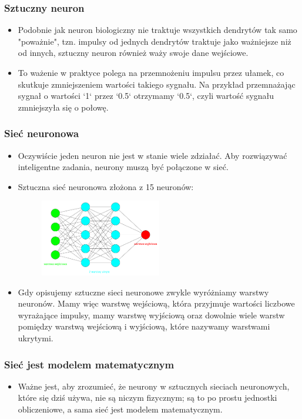 \documentclass{beamer}
\begin{document}
\begin{frame}[fragile]
\frametitle{Sztuczny neuron}
\begin{itemize}
\item Podobnie jak neuron biologiczny nie traktuje wszystkich dendrytów tak samo "poważnie", tzn. impulsy od jednych dendrytów traktuje jako ważniejsze niż od innych, sztuczny neuron również waży swoje dane wejściowe.
\item To ważenie w praktyce polega na przemnożeniu impulsu przez ułamek, co skutkuje zmniejszeniem wartości takiego sygnału. Na przykład przemnażając sygnał o wartości `1` przez `0.5` otrzymamy `0.5`, czyli wartość sygnału zmniejszyła się o połowę. 
\end{itemize}
\end{frame}

\begin{frame}[fragile]
\frametitle{Sieć neuronowa}
\begin{itemize}
\item Oczywiście jeden neuron nie jest w stanie wiele zdziałać. Aby rozwiązywać inteligentne zadania, neurony muszą być połączone w sieć.
\item Sztuczna sieć neuronowa złożona z 15 neuronów: 

                    \begin{figure}[h]
                        \centering
                        \includegraphics[width=0.5\textwidth]{../../img/nn.png}
                    \end{figure}                    
                    \item Gdy opisujemy sztuczne sieci neuronowe zwykle wyróżniamy warstwy neuronów. Mamy więc warstwę wejściową, która przyjmuje wartości liczbowe wyrażające impulsy, mamy warstwę wyjściową oraz dowolnie wiele warstw pomiędzy warstwą wejściową i wyjściową, które nazywamy warstwami ukrytymi. 
\end{itemize}
\end{frame}

\begin{frame}[fragile]
\frametitle{Sieć jest modelem matematycznym}
\begin{itemize}
\item Ważne jest, aby zrozumieć, że neurony w sztucznych sieciach neuronowych, które się dziś używa, nie są niczym fizycznym; są to po prostu jednostki obliczeniowe, a sama sieć jest modelem matematycznym.
\end{itemize}
\end{frame}
\end{document}
